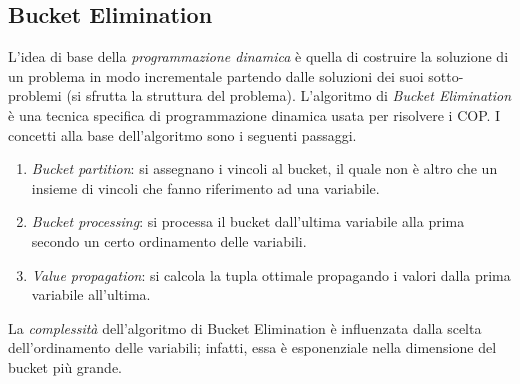 \documentclass[11pt,oneside]{book}
\begin{document}
\subsection{Bucket Elimination}
L'idea di base della \textit{programmazione dinamica} è quella di costruire la soluzione di un problema in modo incrementale partendo dalle soluzioni dei suoi sotto-problemi (si sfrutta la struttura del problema). L'algoritmo di \textit{Bucket Elimination} è una tecnica specifica di programmazione dinamica usata per risolvere i COP.
\newpage
I concetti alla base dell'algoritmo sono i seguenti passaggi.
\begin{enumerate}
    \item \textit{Bucket partition}: si assegnano i vincoli al bucket, il quale non è altro che un insieme di vincoli che fanno riferimento ad una variabile.
    \item \textit{Bucket processing}: si processa il bucket dall'ultima variabile alla prima secondo un certo ordinamento delle variabili.
    \item \textit{Value propagation}: si calcola la tupla ottimale propagando i valori dalla prima variabile all'ultima.
\end{enumerate}
La \textit{complessità} dell'algoritmo di Bucket Elimination è influenzata dalla scelta dell'ordinamento delle variabili; infatti, essa è esponenziale nella dimensione del bucket più grande.
\end{document}
